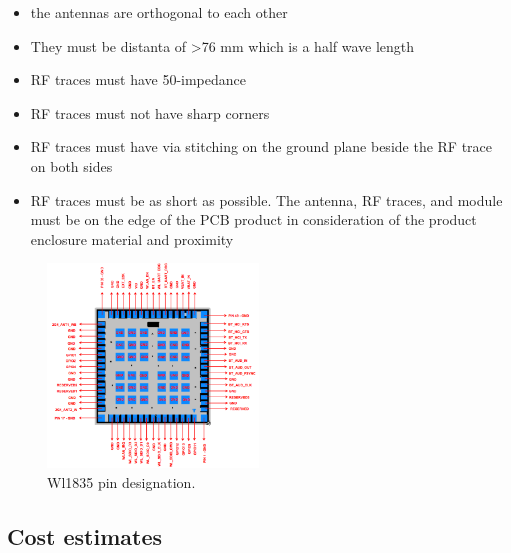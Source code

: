 \begin{itemize}
  \item {the antennas are orthogonal to each other}
  \item {They must be distanta of >76 mm which is a half wave length}
  \item {RF traces must have 50-\textOmega impedance}
  \item {RF traces must not have sharp corners}
  \item {RF traces must have via stitching on the ground plane beside the RF trace on both sides}
  \item {RF traces must be as short as possible. The antenna, RF traces, and module must be on the edge of the PCB product in consideration of the product enclosure material and proximity}
\end{itemize}

\begin{figure}[!htb]
    \centering
    \includegraphics[width=0.5\textwidth,keepaspectratio]{chap/hardFig/100_pin_MOC_wl1835_package}
    \caption{Wl1835 pin designation.}
    \label{fig:wl1835 pcb antennas}
\end{figure}

\subsection{Cost estimates}
